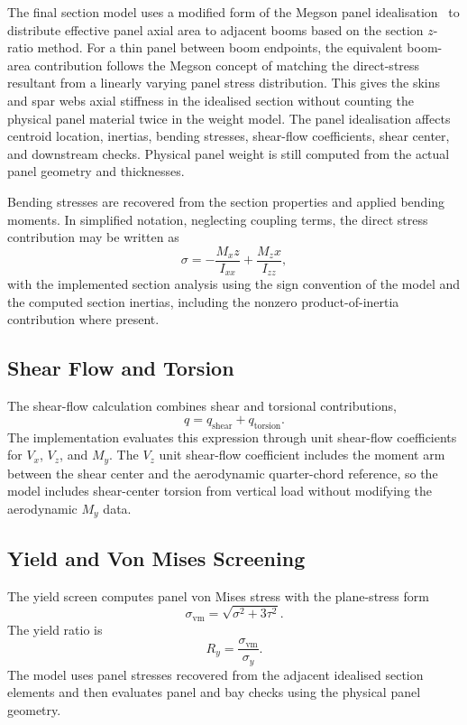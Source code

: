 \documentclass[11pt]{article}
\begin{document}
The final section model uses a modified form of the Megson panel idealisation~\cite{megson} to distribute effective panel axial area to adjacent booms based on the section $z$-ratio method. For a thin panel between boom endpoints, the equivalent boom-area contribution follows the Megson concept of matching the direct-stress resultant from a linearly varying panel stress distribution. This gives the skins and spar webs axial stiffness in the idealised section without counting the physical panel material twice in the weight model. The panel idealisation affects centroid location, inertias, bending stresses, shear-flow coefficients, shear center, and downstream checks. Physical panel weight is still computed from the actual panel geometry and thicknesses.

Bending stresses are recovered from the section properties and applied bending moments. In simplified notation, neglecting coupling terms, the direct stress contribution may be written as
\begin{equation}
  \sigma = -\frac{M_x z}{I_{xx}} + \frac{M_z x}{I_{zz}},
\end{equation}
with the implemented section analysis using the sign convention of the model and the computed section inertias, including the nonzero product-of-inertia contribution where present.

\subsection{Shear Flow and Torsion}

The shear-flow calculation combines shear and torsional contributions,
\begin{equation}
  q = q_{\mathrm{shear}} + q_{\mathrm{torsion}}.
\end{equation}
The implementation evaluates this expression through unit shear-flow coefficients for $V_x$, $V_z$, and $M_y$. The $V_z$ unit shear-flow coefficient includes the moment arm between the shear center and the aerodynamic quarter-chord reference, so the model includes shear-center torsion from vertical load without modifying the aerodynamic $M_y$ data.

\subsection{Yield and Von Mises Screening}

The yield screen computes panel von Mises stress with the plane-stress form
\begin{equation}
  \sigma_{\mathrm{vm}} = \sqrt{\sigma^2 + 3\tau^2}.
\end{equation}
The yield ratio is
\begin{equation}
  R_y = \frac{\sigma_{\mathrm{vm}}}{\sigma_y}.
\end{equation}
The model uses panel stresses recovered from the adjacent idealised section elements and then evaluates panel and bay checks using the physical panel geometry.
\end{document}
